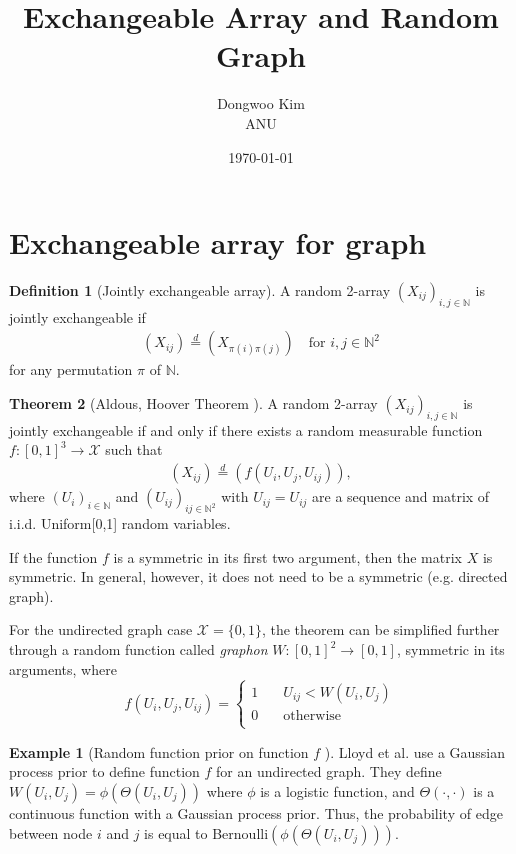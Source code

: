 \documentclass{article}
\title{Exchangeable Array and Random Graph}
\date{\today}
\author{Dongwoo Kim\\ANU}
\theoremstyle{definition}
\newtheorem{definition}{Definition}
\newtheorem{example}{Example}[definition]
\newtheorem{theorem}[definition]{Theorem}
\begin{document}
\maketitle

\section{Exchangeable array for graph}
\begin{definition}[Jointly exchangeable array] A random 2-array $(X_{ij})_{i,j\in \mathbb{N}}$
is jointly exchangeable if
\begin{align}
(X_{ij}) \stackrel{d}{=} (X_{\pi(i)\pi(j)}) \quad \text{for } i,j \in \mathbb{N}^2
\end{align}
for any permutation $\pi$ of $\mathbb{N}$.
\end{definition}

\begin{theorem}[\label{aldous_hoover}Aldous, Hoover Theorem \citep{aldous1981representations,hoover1979relations}] A random 2-array $(X_{ij})_{i,j\in \mathbb{N}}$
is jointly exchangeable if and only if there exists a random measurable function $f:[0,1]^3 \rightarrow \mathcal{X}$ such that
\begin{align}
(X_{ij}) \stackrel{d}{=} (f(U_i, U_j, U_{ij})),
\end{align}
where $(U_{i})_{i \in \mathbb{N}}$ and $(U_{ij})_{ij\in\mathbb{N}^2}$ with $U_{ij} = U_{ij}$ are a sequence and matrix of i.i.d. Uniform[0,1] random variables.
\end{theorem}
If the function $f$ is a symmetric in its first two argument, then the matrix $X$ is symmetric. In general, however, it does not need to be a symmetric (e.g. directed graph).

For the undirected graph case $\mathcal{X} = \{0,1\}$, the theorem can be simplified further through a random function called \textit{graphon} $W:[0,1]^2 \rightarrow [0,1]$, symmetric in its arguments, where
\[ f(U_i, U_j, U_{ij}) = 
  \begin{cases}
    1       & \quad U_{ij} < W(U_i, U_j)\\
    0  & \quad \mathrm{otherwise}\\
  \end{cases}
\]

\begin{example}[Random function prior on function $f$ \citep{Lloyd2013}] Lloyd et al. use a Gaussian process prior to define function $f$ for an undirected graph. They define $W(U_i, U_j) = \phi(\Theta(U_i,U_j))$ where $\phi$ is a logistic function, and $\Theta(\cdot, \cdot)$ is a continuous function with a Gaussian process prior. Thus, the probability of edge between node $i$ and $j$ is equal to Bernoulli$(\phi(\Theta(U_i,U_j)))$.
\end{example}
\end{document}
